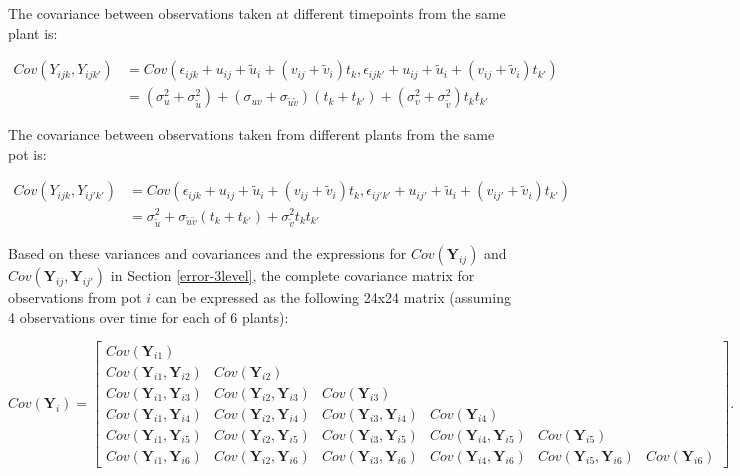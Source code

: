 \documentclass[
]{krantz}
\begin{document}
The covariance between observations taken at different timepoints from the same plant is:

\begin{align*}
Cov(Y_{ijk},Y_{ijk'}) & = Cov(\epsilon_{ijk}+u_{ij}+\tilde{u}_{i}+(v_{ij}+\tilde{v}_{i})t_{k}, \epsilon_{ijk'}+u_{ij}+\tilde{u}_{i}+(v_{ij}+\tilde{v}_{i})t_{k'}) \\
 & = (\sigma_{u}^{2} + \sigma_{\tilde{u}}^{2}) + (\sigma_{uv} + \sigma_{\tilde{u}\tilde{v}})(t_{k}+t_{k'}) + (\sigma_{v}^{2} + \sigma_{\tilde{v}}^{2})t_{k}t_{k'}
\end{align*}

The covariance between observations taken from different plants from the same pot is:

\begin{align*}
Cov(Y_{ijk},Y_{ij'k'}) & = Cov(\epsilon_{ijk}+u_{ij}+\tilde{u}_{i}+(v_{ij}+\tilde{v}_{i})t_{k}, \epsilon_{ij'k'}+u_{ij'}+\tilde{u}_{i}+(v_{ij'}+\tilde{v}_{i})t_{k'}) \\
 & = \sigma_{\tilde{u}}^{2} + \sigma_{\tilde{u}\tilde{v}}(t_{k}+t_{k'}) + \sigma_{\tilde{v}}^{2}t_{k}t_{k'}
\end{align*}

Based on these variances and covariances and the expressions for \(Cov(\textbf{Y}_{ij})\) and \(Cov(\textbf{Y}_{ij},\textbf{Y}_{ij'})\) in Section \ref{error-3level}, the complete covariance matrix for observations from pot \(i\) can be expressed as the following 24x24 matrix (assuming 4 observations over time for each of 6 plants):

\[  Cov(\textbf{Y}_{i}) = \left[
          \begin{array}{cccccc}
            Cov(\textbf{Y}_{i1}) & & & & & \\
            Cov(\textbf{Y}_{i1},\textbf{Y}_{i2}) & Cov(\textbf{Y}_{i2}) & & & & \\
            Cov(\textbf{Y}_{i1},\textbf{Y}_{i3}) & Cov(\textbf{Y}_{i2},\textbf{Y}_{i3}) & Cov(\textbf{Y}_{i3}) & & & \\
            Cov(\textbf{Y}_{i1},\textbf{Y}_{i4}) & Cov(\textbf{Y}_{i2},\textbf{Y}_{i4}) & Cov(\textbf{Y}_{i3},\textbf{Y}_{i4}) & Cov(\textbf{Y}_{i4}) & & \\
            Cov(\textbf{Y}_{i1},\textbf{Y}_{i5}) & Cov(\textbf{Y}_{i2},\textbf{Y}_{i5}) & Cov(\textbf{Y}_{i3},\textbf{Y}_{i5}) & Cov(\textbf{Y}_{i4},\textbf{Y}_{i5}) & Cov(\textbf{Y}_{i5}) & \\
            Cov(\textbf{Y}_{i1},\textbf{Y}_{i6}) & Cov(\textbf{Y}_{i2},\textbf{Y}_{i6}) & Cov(\textbf{Y}_{i3},\textbf{Y}_{i6}) & Cov(\textbf{Y}_{i4},\textbf{Y}_{i6}) & Cov(\textbf{Y}_{i5},\textbf{Y}_{i6}) & Cov(\textbf{Y}_{i6})
          \end{array} \right]. \]
\end{document}
